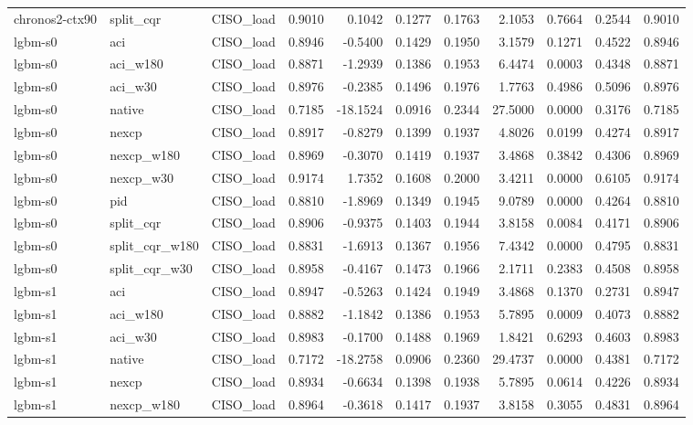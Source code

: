 \begin{tabular}{lllrrrrrrrr}
chronos2-ctx90 & split_cqr & CISO_load & 0.9010 & 0.1042 & 0.1277 & 0.1763 & 2.1053 & 0.7664 & 0.2544 & 0.9010 \\
lgbm-s0 & aci & CISO_load & 0.8946 & -0.5400 & 0.1429 & 0.1950 & 3.1579 & 0.1271 & 0.4522 & 0.8946 \\
lgbm-s0 & aci_w180 & CISO_load & 0.8871 & -1.2939 & 0.1386 & 0.1953 & 6.4474 & 0.0003 & 0.4348 & 0.8871 \\
lgbm-s0 & aci_w30 & CISO_load & 0.8976 & -0.2385 & 0.1496 & 0.1976 & 1.7763 & 0.4986 & 0.5096 & 0.8976 \\
lgbm-s0 & native & CISO_load & 0.7185 & -18.1524 & 0.0916 & 0.2344 & 27.5000 & 0.0000 & 0.3176 & 0.7185 \\
lgbm-s0 & nexcp & CISO_load & 0.8917 & -0.8279 & 0.1399 & 0.1937 & 4.8026 & 0.0199 & 0.4274 & 0.8917 \\
lgbm-s0 & nexcp_w180 & CISO_load & 0.8969 & -0.3070 & 0.1419 & 0.1937 & 3.4868 & 0.3842 & 0.4306 & 0.8969 \\
lgbm-s0 & nexcp_w30 & CISO_load & 0.9174 & 1.7352 & 0.1608 & 0.2000 & 3.4211 & 0.0000 & 0.6105 & 0.9174 \\
lgbm-s0 & pid & CISO_load & 0.8810 & -1.8969 & 0.1349 & 0.1945 & 9.0789 & 0.0000 & 0.4264 & 0.8810 \\
lgbm-s0 & split_cqr & CISO_load & 0.8906 & -0.9375 & 0.1403 & 0.1944 & 3.8158 & 0.0084 & 0.4171 & 0.8906 \\
lgbm-s0 & split_cqr_w180 & CISO_load & 0.8831 & -1.6913 & 0.1367 & 0.1956 & 7.4342 & 0.0000 & 0.4795 & 0.8831 \\
lgbm-s0 & split_cqr_w30 & CISO_load & 0.8958 & -0.4167 & 0.1473 & 0.1966 & 2.1711 & 0.2383 & 0.4508 & 0.8958 \\
lgbm-s1 & aci & CISO_load & 0.8947 & -0.5263 & 0.1424 & 0.1949 & 3.4868 & 0.1370 & 0.2731 & 0.8947 \\
lgbm-s1 & aci_w180 & CISO_load & 0.8882 & -1.1842 & 0.1386 & 0.1953 & 5.7895 & 0.0009 & 0.4073 & 0.8882 \\
lgbm-s1 & aci_w30 & CISO_load & 0.8983 & -0.1700 & 0.1488 & 0.1969 & 1.8421 & 0.6293 & 0.4603 & 0.8983 \\
lgbm-s1 & native & CISO_load & 0.7172 & -18.2758 & 0.0906 & 0.2360 & 29.4737 & 0.0000 & 0.4381 & 0.7172 \\
lgbm-s1 & nexcp & CISO_load & 0.8934 & -0.6634 & 0.1398 & 0.1938 & 5.7895 & 0.0614 & 0.4226 & 0.8934 \\
lgbm-s1 & nexcp_w180 & CISO_load & 0.8964 & -0.3618 & 0.1417 & 0.1937 & 3.8158 & 0.3055 & 0.4831 & 0.8964 \\

\end{tabular}
